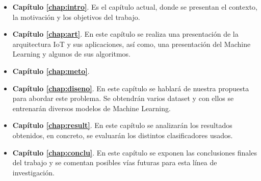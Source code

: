 \begin{itemize}
    \item \textbf{Capítulo \ref{chap:intro}}. Es el capítulo actual, donde se presentan el contexto, la motivación y los objetivos del trabajo.
    \item \textbf{Capítulo \ref{chap:art}}. En este capítulo se realiza una presentación de la arquitectura IoT y sus aplicaciones, así como, una presentación del Machine Learning y algunos de sus algoritmos.
    \item \textbf{Capítulo \ref{chap:meto}}. 
    \item \textbf{Capítulo \ref{chap:diseno}}. En este capítulo se hablará de nuestra propuesta para abordar este problema. Se obtendrán varios dataset y con ellos se entrenarán diversos modelos de Machine Learning.
    \item \textbf{Capítulo \ref{chap:result}}. En este capítulo se analizarán los resultados obtenidos, en concreto, se evaluarán los distintos clasificadores usados.
    \item \textbf{Capítulo \ref{chap:conclu}}. En este capítulo se exponen las conclusiones finales del trabajo y se comentan posibles vías futuras para esta línea de investigación.
\end{itemize}  

